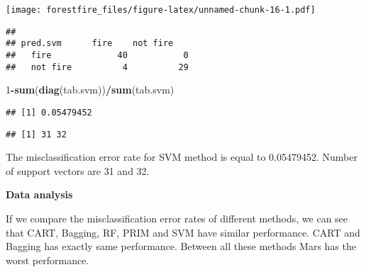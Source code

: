 \documentclass[
]{article}
\newenvironment{Shaded}{\begin{snugshade}}{\end{snugshade}}
\newcommand{\DecValTok}[1]{\textcolor[rgb]{0.00,0.00,0.81}{#1}}
\newcommand{\KeywordTok}[1]{\textcolor[rgb]{0.13,0.29,0.53}{\textbf{#1}}}
\newcommand{\NormalTok}[1]{#1}
\newcommand{\OperatorTok}[1]{\textcolor[rgb]{0.81,0.36,0.00}{\textbf{#1}}}
\begin{document}
\texttt{[image: forestfire\_files/figure-latex/unnamed-chunk-16-1.pdf]}

\begin{Shaded}
\end{Shaded}

\begin{verbatim}
##              
## pred.svm      fire    not fire   
##   fire             40           0
##   not fire          4          29
\end{verbatim}

\begin{Shaded}
\begin{Highlighting}[]
\DecValTok{1}\OperatorTok{-}\KeywordTok{sum}\NormalTok{(}\KeywordTok{diag}\NormalTok{(tab.svm))}\OperatorTok{/}\KeywordTok{sum}\NormalTok{(tab.svm)}
\end{Highlighting}
\end{Shaded}

\begin{verbatim}
## [1] 0.05479452
\end{verbatim}

\begin{Shaded}
\end{Shaded}

\begin{verbatim}
## [1] 31 32
\end{verbatim}

The misclassification error rate for SVM method is equal to 0.05479452.
Number of support vectors are 31 and 32.

\textbf{Data analysis}

If we compare the misclassification error rates of different methods, we
can see that CART, Bagging, RF, PRIM and SVM have similar performance.
CART and Bagging has exactly same performance. Between all these methods
Mars has the worst performance.
\end{document}
